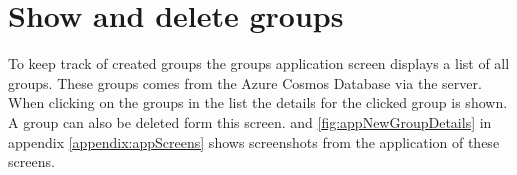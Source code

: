 \section{Show and delete groups}\label{sec:implAppShowGroup}
To keep track of created groups the groups application screen displays a list of all groups.
These groups comes from the Azure Cosmos Database \cite{IntroductionAzureCosmos} via the server.
When clicking on the groups in the list the details for the clicked group is shown.
A group can also be deleted form this screen.
 and \ref{fig:appNewGroupDetails} in appendix \ref{appendix:appScreens} shows screenshots from the application of these screens.
